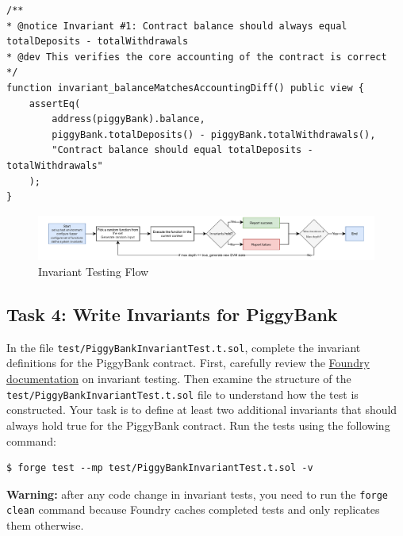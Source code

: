 \documentclass[12pt]{article}
\begin{document}
\noindent \begin{minipage}{\textwidth}
    \begin{lstlisting}[language=Solidity]
/**
* @notice Invariant #1: Contract balance should always equal totalDeposits - totalWithdrawals
* @dev This verifies the core accounting of the contract is correct
*/
function invariant_balanceMatchesAccountingDiff() public view {
    assertEq(
        address(piggyBank).balance,
        piggyBank.totalDeposits() - piggyBank.totalWithdrawals(),
        "Contract balance should equal totalDeposits - totalWithdrawals"
    );
}
\end{lstlisting}
\end{minipage}

\begin{figure}[h!]
    \centering
    \includegraphics[width=1\textwidth]{invariant-testing.pdf}
    \caption{Invariant Testing Flow}\label{fig:invariant-testing}
\end{figure}

\subsection*{Task 4: Write Invariants for PiggyBank}

In the file \texttt{test/PiggyBankInvariantTest.t.sol}, complete the invariant
definitions for the PiggyBank contract. First, carefully review the
\href{https://book.getfoundry.sh/forge/invariant-testing}{Foundry
    documentation} on invariant testing. Then examine the structure of the
\texttt{test/PiggyBankInvariantTest.t.sol} file to understand how the test is
constructed. Your task is to define at least two additional invariants that
should always hold true for the PiggyBank contract. Run the tests using the
following command:

\noindent \begin{minipage}{\textwidth}
    \begin{verbatim}
$ forge test --mp test/PiggyBankInvariantTest.t.sol -v
\end{verbatim}
\end{minipage}

\noindent
\textbf{Warning:} after any code change in invariant tests, you need to run the \texttt{forge clean} command because Foundry caches completed tests and only replicates them otherwise.
\end{document}
